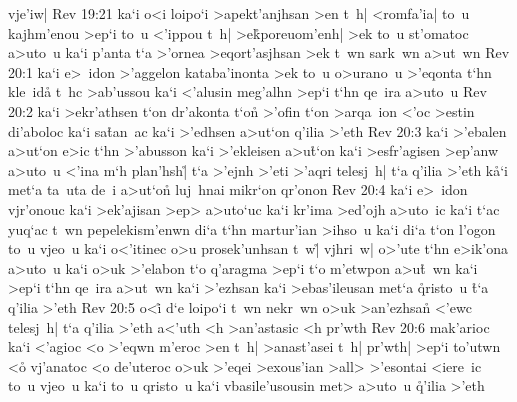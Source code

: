 vje'iw|\bibvsend
\vs Rev 19:21
ka`i
o<i
loipo`i
>apekt'anjhsan
>en
t~h|
<romfa'ia|
to~u
kajhm'enou
>ep`i
to~u
<'ippou
t~h|
>e\r{k}poreuom'enh|
>ek
to~u
st'omatoc
a>uto~u
ka`i
p'anta
t`a
>'ornea
>eqort'asjhsan
>ek
t~wn
sark~wn
a>ut~wn\bibvsend
\vs Rev 20:1
ka`i
e>~idon
>'aggelon
kataba'inonta
>ek
to~u
o>urano~u
>'eqonta
t`hn
kle~id\r{a}
t~hc
>ab'ussou
ka`i
<'alusin
meg'alhn
>ep`i
t`hn
qe~ira
a>uto~u\bibvsend
\vs Rev 20:2
ka`i
>ekr'athsen
t`on
dr'akonta
t`on\r{}
>'ofin
t`on
>arqa~ion
<'oc
>estin
di'aboloc
ka`i
sa\r{t}an~ac
ka`i
>'edhsen
a>ut`on
q'ilia
>'eth\bibvsend
\vs Rev 20:3
ka`i
>'ebalen
a>ut`on
e>ic
t`hn
>'abusson
ka`i
>'ekleisen
a>u\r{t}`on
ka`i
>esfr'agisen
>ep'anw
a>uto~u
<'ina
m`h
plan'hsh|\r{}
t`a
>'ejnh
>'eti
>'aqri
telesj~h|
t`a
q'ilia
>'eth
k\r{a}`i
met`a
ta~uta
de~i
a>ut`on\r{}
luj~hnai
mikr`on
qr'onon\bibvsend
\vs Rev 20:4
ka`i
e>~idon
vjr'onouc
ka`i
>ek'ajisan
>ep>
a>uto`uc
ka`i
kr'ima
>ed'ojh
a>uto~ic
ka`i
t`ac
yuq`ac
t~wn
pepelekism'enwn
di`a
t`hn
martur'ian
>ihso~u
ka`i
di`a
t`on
l'ogon
to~u
vjeo~u
ka`i
o<'itinec
o>u
prosek'unhsan
t~w|\r{}
vjhri~w|
o>'ute
t`hn
e>ik'ona
a>uto~u
ka`i
o>uk
>'elabon
t`o
q'aragma
>ep`i
t`o
m'etwpon
a>u\r{t}~wn
ka`i
>ep`i
t`hn
qe~ira
a>ut~wn
ka`i
>'ezhsan
ka`i
>ebas'ileusan
met`a
\r{q}risto~u
\r{t}`a
q'ilia
>'eth\bibvsend
\vs Rev 20:5
o<i\r{}
d`e
loipo`i
t~wn
nekr~wn
o>uk
>an'ezhsan\r{}
<'ewc
telesj~h|
t`a
q'ilia
>'eth
a<'uth
<h
>an'astasic
<h
pr'wth\bibvsend
\vs Rev 20:6
mak'arioc
ka`i
<'agioc
<o
>'eqwn
m'eroc
>en
t~h|
>anast'asei
t~h|
pr'wth|
>ep`i
to'utwn
<o\r{}
vj'anatoc
<o
de'uteroc
o>uk
>'eqei
>exous'ian
>all>
>'esontai
<iere~ic
to~u
vjeo~u
ka`i
to~u
qristo~u
ka`i
vbasile'usousin
met>
a>uto~u
\r{q}'ilia
>'eth\bibvsend
